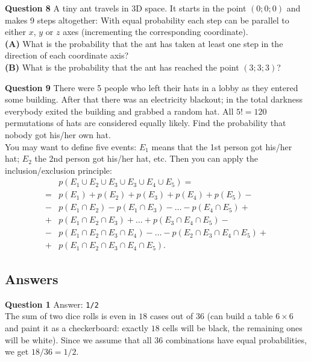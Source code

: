 \documentclass[jou]{apa6}
\begin{document}
\vspace{10pt}
{\bf Question 8} A tiny ant travels in 3D space. It starts in the point $(0;0;0)$ and 
makes 9 steps altogether: With equal probability 
each step can be parallel to either $x$, $y$ or $z$ axes (incrementing the corresponding coordinate).\\ 
{\bf (A)} What is the probability that the 
ant has taken at least one step in the direction of each coordinate axis?\\
{\bf (B)} What is the probability that the ant has reached the point $(3;3;3)$?

\vspace{10pt}
{\bf Question 9} There were 5 people who left their hats in a lobby as they entered some building. 
After that there was an electricity blackout; in the total darkness everybody exited the building and grabbed a random hat.
All $5!=120$ permutations of hats are considered equally likely. Find the probability that nobody got his/her
own hat.\\ 
You may want to define five events: $E_1$ means that the 1st person 
got his/her hat; $E_2$ \textendash{} the 2nd person got his/her hat, etc. 
Then you can apply the inclusion/exclusion principle:
\begin{align}
 & p(E_1 \cup E_2 \cup E_3 \cup E_3 \cup E_4 \cup E_5) = \nonumber \\
= & p(E_1) + p(E_2) + p(E_3) + p(E_4) + p(E_5) - \nonumber \\
- & p(E_1 \cap E_2) - p(E_1 \cap E_3) - \ldots - p(E_4 \cap E_5) + \nonumber \\
+ & p(E_1 \cap E_2 \cap E_3) + \ldots + p(E_3 \cap E_4 \cap E_5) - \nonumber \\
- & p(E_1 \cap E_2 \cap E_3 \cap E_4) - \ldots - p(E_2 \cap E_3 \cap E_4 \cap E_5) + \nonumber \\
+ & p(E_1 \cap E_2 \cap E_3 \cap E_4 \cap E_5). \nonumber
\end{align}




\newpage
\subsection{Answers}

\vspace{10pt}
{\bf Question 1} Answer: {\tt 1/2}\\
The sum of two dice rolls is even in $18$ cases out of $36$ (can build a table
$6 \times 6$ and paint it as a checkerboard: exactly $18$ cells will be black, 
the remaining ones will be white). Since we assume that
all $36$ combinations have equal probabilities, we get $18/36 = 1/2$. 
\end{document}

